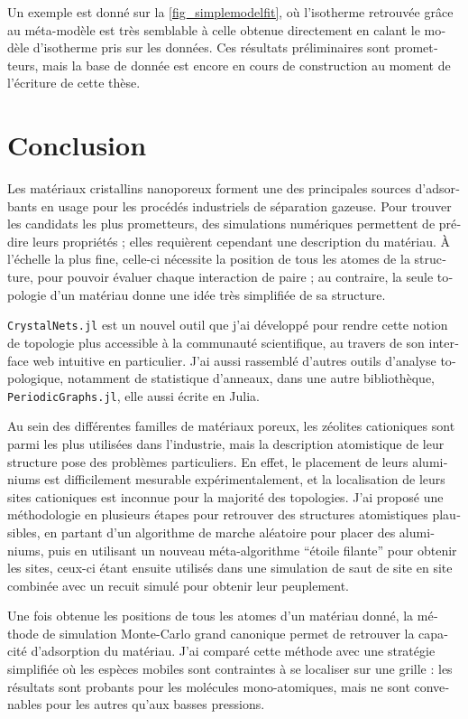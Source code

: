 \documentclass[thesis]{subfiles}
\begin{document}
\begin{otherlanguage}{french}
Un exemple est donné sur la \cref{fig_simplemodelfit}, où l'isotherme retrouvée grâce au méta-modèle est très semblable à celle obtenue directement en calant le modèle d'isotherme pris sur les données. Ces résultats préliminaires sont prometteurs, mais la base de donnée est encore en cours de construction au moment de l'écriture de cette thèse.

\section*{Conclusion}

Les matériaux cristallins nanoporeux forment une des principales sources d'adsorbants en usage pour les procédés industriels de séparation gazeuse. Pour trouver les candidats les plus prometteurs, des simulations numériques permettent de prédire leurs propriétés ; elles requièrent cependant une description du matériau. À l'échelle la plus fine, celle-ci nécessite la position de tous les atomes de la structure, pour pouvoir évaluer chaque interaction de paire ; au contraire, la seule topologie d'un matériau donne une idée très simplifiée de sa structure.

\texttt{CrystalNets.jl} est un nouvel outil que j'ai développé pour rendre cette notion de topologie plus accessible à la communauté scientifique, au travers de son interface web intuitive en particulier. J'ai aussi rassemblé d'autres outils d'analyse topologique, notamment de statistique d'anneaux, dans une autre bibliothèque, \texttt{PeriodicGraphs.jl}, elle aussi écrite en Julia.

Au sein des différentes familles de matériaux poreux, les zéolites cationiques sont parmi les plus utilisées dans l'industrie, mais la description atomistique de leur structure pose des problèmes particuliers. En effet, le placement de leurs aluminiums est difficilement mesurable expérimentalement, et la localisation de leurs sites cationiques est inconnue pour la majorité des topologies. J'ai proposé une méthodologie en plusieurs étapes pour retrouver des structures atomistiques plausibles, en partant d'un algorithme de marche aléatoire pour placer des aluminiums, puis en utilisant un nouveau méta-algorithme ``étoile filante'' pour obtenir les sites, ceux-ci étant ensuite utilisés dans une simulation de saut de site en site combinée avec un recuit simulé pour obtenir leur peuplement.

Une fois obtenue les positions de tous les atomes d'un matériau donné, la méthode de simulation Monte-Carlo grand canonique permet de retrouver la capacité d'adsorption du matériau. J'ai comparé cette méthode avec une stratégie simplifiée où les espèces mobiles sont contraintes à se localiser sur une grille : les résultats sont probants pour les molécules mono-atomiques, mais ne sont convenables pour les autres qu'aux basses pressions.


\end{otherlanguage}
\end{document}
